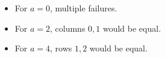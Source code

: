 \begin{itemize}
\begin{enumerate}
   \vspace{-20pt}
   \begin{itemize}
     \item For \( a = 0 \), multiple failures.
     \item For \( a = 2 \), columns \( 0,1 \) would be equal.
     \item For \( a = 4 \), rows \( 1,2 \) would be equal.
   \end{itemize}

 \end{enumerate}

\end{itemize}

